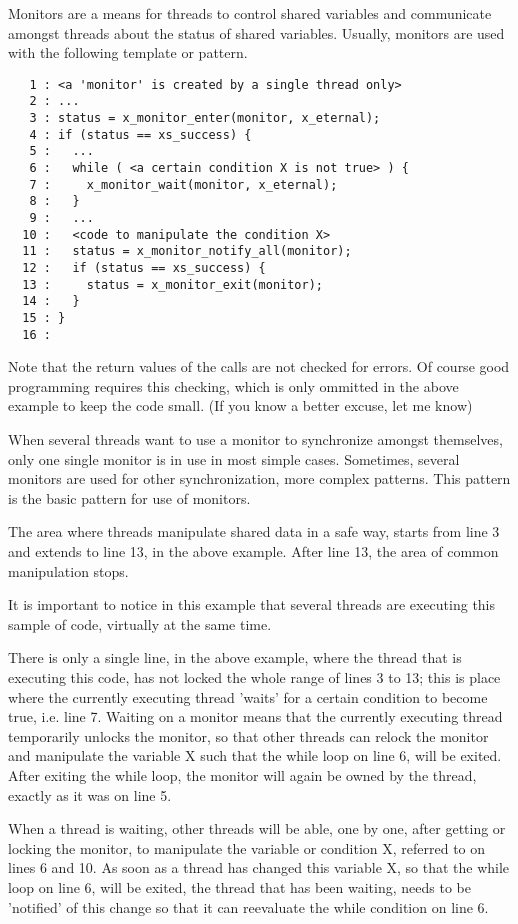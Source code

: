 Monitors are a means for threads to control shared variables and communicate
amongst threads about the status of shared variables. Usually, monitors are
used with the following template or pattern.

\bcode
\begin{verbatim}
   1 : <a 'monitor' is created by a single thread only>
   2 : ...
   3 : status = x_monitor_enter(monitor, x_eternal);
   4 : if (status == xs_success) {
   5 :   ...
   6 :   while ( <a certain condition X is not true> ) {
   7 :     x_monitor_wait(monitor, x_eternal);
   8 :   }
   9 :   ...
  10 :   <code to manipulate the condition X>
  11 :   status = x_monitor_notify_all(monitor);
  12 :   if (status == xs_success) {
  13 :     status = x_monitor_exit(monitor);
  14 :   }
  15 : }
  16 :
\end{verbatim}
\ecode

Note that the return values of the \oswald calls are not checked for errors.
Of course good programming requires this checking, which is only ommitted in
the above example to keep the code small. (If you know a better excuse, let
me know)

When several threads want to use a monitor to synchronize amongst
themselves, only one single monitor is in use in most simple cases.
Sometimes, several monitors are used for other synchronization, more complex patterns.
This pattern is the basic pattern for use of monitors.

The area where threads manipulate shared data in a safe way, starts from
line 3 and extends to line 13, in the above example. After line 13, the area
of common manipulation stops.

It is important to notice in this example that several threads are executing
this sample of code, virtually at the same time.

There is only a single line, in the above example, where the thread that is
executing this code, has not locked the whole range of lines 3 to 13; this
is place where the currently executing thread 'waits' for a certain
condition to become true, i.e. line 7. Waiting on a monitor means that the
currently executing thread temporarily unlocks the monitor, so that other
threads can relock the monitor and manipulate the variable X such that the 
while loop on line 6, will be exited. After exiting the while loop, the
monitor will again be owned by the thread, exactly as it was on line 5.

When a thread is waiting, other threads will be able, one by one, after
getting or locking the monitor, to manipulate the variable or condition X,
referred to on lines 6 and 10. As soon as a thread has changed this variable
X, so that the while loop on line 6, will be exited, the thread that has
been waiting, needs to be 'notified' of this change so that it can
reevaluate the while condition on line 6. 

